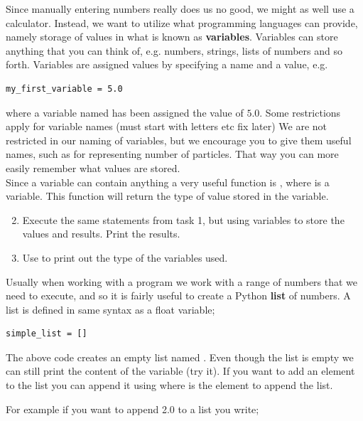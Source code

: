 \documentclass{article}
\begin{document}
Since manually entering numbers really does us no good, we might as well use a
calculator. Instead, we want to utilize what programming languages can provide,
namely storage of values in what is known as {\bf variables}. Variables can store
anything that you can think of, e.g. numbers, strings, lists of numbers and so
forth. Variables are assigned values by specifying a name and a value, e.g.

\begin{lstlisting}
my_first_variable = 5.0
\end{lstlisting}

where a variable named  has been assigned the value
of $5.0$.
Some restrictions apply for variable names (must start with letters etc fix later) We are not restricted in our naming of variables, but we encourage you to give
them useful names, such as  for representing number of
particles. That way you can more easily remember what values are stored.\\

Since a variable can contain anything a very useful function is ,
where  is a variable. This function will return the type of value stored
in the variable.

\begin{enumerate}
  \setcounter{enumi}{1}
  \item Execute the same statements from task 1, but using variables to store
    the values and results. Print the results.
  \item Use  to print out the type of the variables used.
\end{enumerate}

Usually when working with a program we work with a range of numbers
that we need to execute, and so it is fairly useful to create a Python {\bf list}
of numbers.
A list is defined in same syntax as a float variable;

\begin{lstlisting}
simple_list = []
\end{lstlisting}

The above code creates an empty list named .
Even though the list is empty we can still print
the content of the variable (try it).
If you want to add an element to the list you can
append it using  where  is the element to append the list.

For example if you want to append 2.0 to a list you write;
\end{document}
